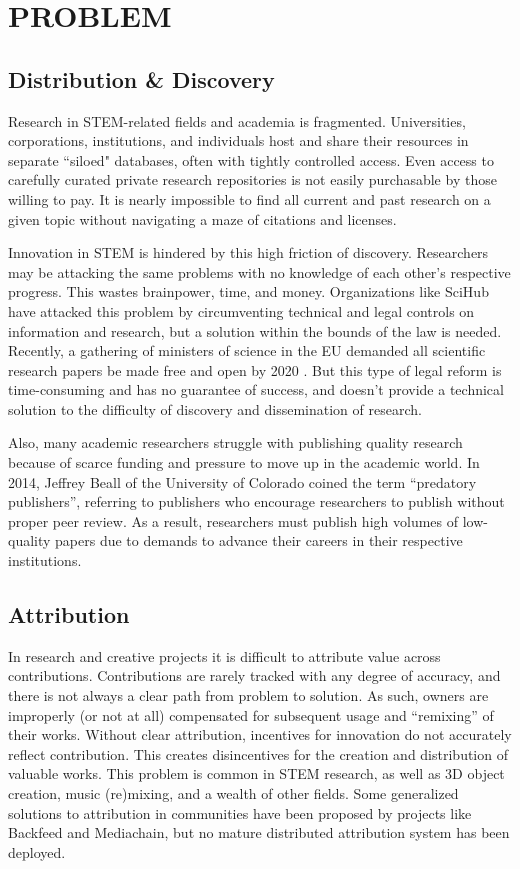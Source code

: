 \documentclass[a4paper, 10pt, conference]{ieeeconf}      %
\begin{document}
\section{PROBLEM}\label{problem}
\subsection{Distribution \& Discovery}\label{distribution}
Research in STEM-related fields and academia is fragmented. Universities, corporations, institutions, and individuals host and share their resources in separate ``siloed" databases, often with tightly controlled access. 
Even access to carefully curated private research repositories is not easily purchasable by those willing to pay. 
It is nearly impossible to find all current and past research on a given topic without navigating a maze of citations and licenses.

Innovation in STEM is hindered by this high friction of discovery. 
Researchers may be attacking the same problems with no knowledge of each other's respective progress. 
This wastes brainpower, time, and money. Organizations like SciHub have attacked this problem by circumventing technical and legal controls on information and research, but a solution within the bounds of the law is needed. 
Recently, a gathering of ministers of science in the EU demanded all scientific research papers be made free and open by 2020 \cite{khomami2016}. 
But this type of legal reform is time-consuming and has no guarantee of success, and doesn’t provide a technical solution to the difficulty of discovery and dissemination of research. 

Also, many academic researchers struggle with publishing quality research because of scarce funding and pressure to move up in the academic world.
In 2014, Jeffrey Beall of the University of Colorado coined the term “predatory publishers”, referring to publishers who encourage researchers to publish without proper peer review\cite{wager2017}.
As a result, researchers must publish high volumes of low-quality papers due to demands to advance their careers in their respective institutions. 

\subsection{Attribution}\label{attribution}
In research and creative projects it is difficult to attribute value across contributions. 
Contributions are rarely tracked with any degree of accuracy, and there is not always a clear path from problem to solution. 
As such, owners are improperly (or not at all) compensated for subsequent usage and ``remixing” of their works.
Without clear attribution, incentives for innovation do not accurately reflect contribution. 
This creates disincentives for the creation and distribution of valuable works. 
This problem is common in STEM research, as well as 3D object creation, music (re)mixing, and a wealth of other fields. 
Some generalized solutions to attribution in communities have been proposed by projects like Backfeed and Mediachain, but no mature distributed attribution system has been deployed.
\end{document}
